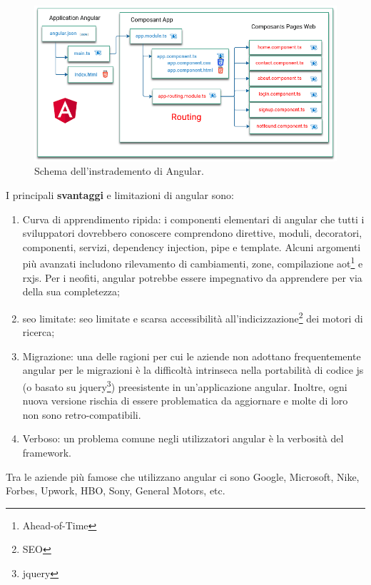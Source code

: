 \begin{figure}[H]
\centering
\includegraphics[width=1\textwidth]{Images/routing-architecture-angular.png}
\caption{\label{fig:angular routing}Schema dell'instrademento di Angular.}
\end{figure}

I principali \textbf{svantaggi} e limitazioni di \gls{angular} sono:

\begin{enumerate}
    \item Curva di apprendimento ripida: i componenti elementari di \gls{angular} che tutti i sviluppatori dovrebbero conoscere comprendono direttive, moduli, decoratori, componenti, servizi, dependency injection, pipe e template. Alcuni argomenti più avanzati includono rilevamento di cambiamenti, zone, compilazione \acrshort{aot}\footnote{\glsdesc{Ahead-of-Time}} e \acrshort{rxjs}. Per i neofiti, \gls{angular} potrebbe essere impegnativo da apprendere per via della sua completezza;
    \item \acrshort{seo} limitate: \acrshort{seo} limitate e scarsa accessibilità all'indicizzazione\footnote{\glsdesc{SEO}} dei motori di ricerca;
    \item Migrazione: una delle ragioni per cui le aziende non adottano frequentemente \gls{angular} per le migrazioni è la difficoltà intrinseca nella portabilità di codice \acrshort{js} (o basato su \gls{jquery}\footnote{\glsdesc{jquery}}) preesistente in un'applicazione \gls{angular}. Inoltre, ogni nuova versione rischia di essere problematica da aggiornare e molte di loro non sono retro-compatibili.
    \item Verboso: un problema comune negli utilizzatori \gls{angular} è la verbosità del \gls{framework}.
\end{enumerate}

Tra le aziende più famose che utilizzano \gls{angular} ci sono Google, Microsoft, Nike, Forbes, Upwork, HBO, Sony, General Motors, etc.


